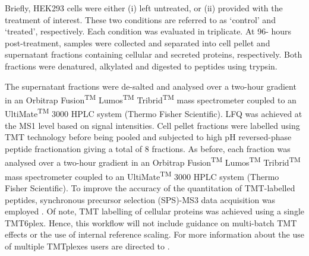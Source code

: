 \documentclass[9pt,a4paper,]{extarticle}
\begin{document}
Briefly, HEK293 cells were either (i) left untreated, or (ii) provided with the
treatment of interest. These two conditions are referred to as `control' and
`treated', respectively. Each condition was evaluated in triplicate. At 96-
hours post-treatment, samples were collected and separated into cell pellet and
supernatant fractions containing cellular and secreted proteins, respectively.
Both fractions were denatured, alkylated and digested to peptides using trypsin.

The supernatant fractions were de-salted and analysed over a two-hour gradient
in an Orbitrap Fusion\textsuperscript{TM} Lumos\textsuperscript{TM} Tribrid\textsuperscript{TM} mass spectrometer coupled to an
UltiMate\textsuperscript{TM} 3000 HPLC system (Thermo Fisher Scientific). LFQ was achieved at the
MS1 level based on signal intensities. Cell pellet fractions were labelled using
TMT technology before being pooled and subjected to high pH reversed-phase peptide
fractionation giving a total of 8 fractions. As before, each fraction was
analysed over a two-hour gradient in an Orbitrap Fusion\textsuperscript{TM} Lumos\textsuperscript{TM} Tribrid\textsuperscript{TM}
mass spectrometer coupled to an UltiMate\textsuperscript{TM} 3000 HPLC system (Thermo Fisher
Scientific). To improve the accuracy of the quantitation of TMT-labelled peptides,
synchronous precursor selection (SPS)-MS3 data acquisition was employed
\citep{McAlister2014, Ting2011}. Of note, TMT labelling of cellular proteins was
achieved using a single TMT6plex. Hence, this workflow will not include guidance
on multi-batch TMT effects or the use of internal reference scaling. For more
information about the use of multiple TMTplexes users are directed to \citep{Plubell2017, Brenes2019}.
\end{document}
